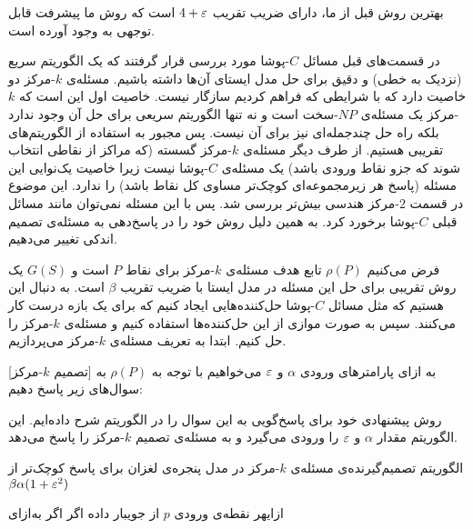 بهترین روش قبل از ما، دارای ضریب تقریب $4+\varepsilon$ است  که روش ما پیشرفت قابل توجهی به وجود آورده است.

در قسمت‌های قبل مسائل $C$-پوشا مورد بررسی قرار گرفتند که یک الگوریتم سریع (نزدیک به خطی) و دقیق برای حل مدل ایستای آن‌ها داشته باشیم. مسئله‌ی $k$-مرکز دو خاصیت دارد که با شرایطی که فراهم کردیم سازگار نیست. خاصیت اول این است که $k$-مرکز یک مسئله‌‌ی $NP$-سخت است و نه تنها الگوریتم سریعی برای حل آن وجود ندارد بلکه راه حل چندجمله‌ای نیز برای آن نیست. پس مجبور به استفاده از الگوریتم‌های تقریبی هستیم. از طرف دیگر مسئله‌ی $k$-مرکز گسسته (که مراکز از نقاطی انتخاب شوند که جزو نقاط ورودی باشد) یک مسئله‌ی $C$-پوشا نیست زیرا خاصیت یک‌نوایی این مسئله (پاسخ هر زیرمجموعه‌ای کوچک‌تر مساوی کل نقاط باشد) را ندارد. این موضوع در قسمت $2$-مرکز هندسی  بیش‌تر بررسی شد. پس با این مسئله نمی‌توان مانند مسائل قبلی  $C$-پوشا برخورد کرد. به همین دلیل روش خود را در پاسخ‌دهی به مسئله‌ی تصمیم اندکی تغییر می‌دهیم.

فرض می‌کنیم $\rho(P)$ تابع هدف مسئله‌ی $k$-مرکز برای نقاط $P$ است و $G(S)$ یک روش تقریبی برای حل این مسئله در مدل ایستا با ضریب تقریب $\beta$ است. به دنبال این هستیم که مثل مسائل $C$-پوشا حل‌کننده‌هایی ایجاد کنیم که برای یک بازه درست کار می‌کنند. سپس به صورت موازی از این حل‌کننده‌ها استفاده کنیم و مسئله‌ی $k$-مرکز را حل کنیم. ابتدا به تعریف مسئله‌ی $k$-مرکز می‌پردازیم.

[تصمیم $k$-مرکز]
به ازای پارامترهای ورودی $\alpha$ و $\varepsilon$ می‌خواهیم با توجه به $\rho(P)$ به سوال‌های زیر پاسخ دهیم:

روش پیشنهادی خود برای پاسخ‌گویی به این سوال را در الگوریتم   شرح داده‌ایم. این الگوریتم مقدار $\alpha$ و $\varepsilon$ را ورودی می‌گیرد و به مسئله‌ی تصمیم $k$-مرکز را پاسخ می‌دهد.
\caption
{الگوریتم تصمیم‌گیرنده‌ی مسئله‌ی  $k$-مرکز در مدل پنجره‌ی لغزان برای پاسخ کوچک‌تر از $\beta \alpha ( 1+ \varepsilon^2)$ }
‌ازای{هر نقطه‌ی ورودی $p$ از جویبار داده}
‌اگر{}
‌اگر{}
‌به‌ازای{}


